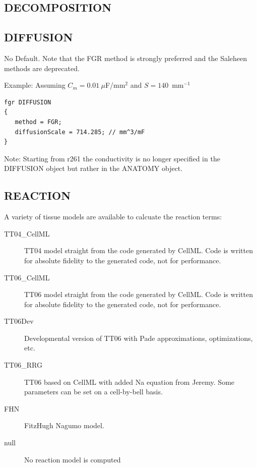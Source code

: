 \documentclass{article}
\begin{document}
\subsection{DECOMPOSITION}
\begin{keywords}
\end{keywords}

\subsection{DIFFUSION}

\begin{keywords}
  {No Default. Note that the FGR method is strongly preferred and the
    Saleheen methods are deprecated.  }
\end{keywords}


Example:
Assuming $C_m = 0.01~\mu$F/mm$^2$ and $S=140$~mm$^{-1}$
\begin{verbatim}
fgr DIFFUSION
{
   method = FGR;
   diffusionScale = 714.285; // mm^3/mF
}
\end{verbatim}

Note: Starting from r261 the conductivity is no longer specified in the
DIFFUSION object but rather in the ANATOMY object.

\subsection{REACTION}
A variety of tissue models are available to calcuate the reaction terms:

\begin{description}
  \item[TT04\_CellML] TT04 model straight from the code generated by
    CellML.  Code is written for absolute fidelity to the generated
    code, not for performance.
  \item[TT06\_CellML] TT06 model straight from the code generated by
    CellML.  Code is written for absolute fidelity to the generated
    code, not for performance.
  \item[TT06Dev] Developmental version of TT06 with Pade approximations,
    optimizations, etc.
  \item[TT06\_RRG] TT06 based on CellML with added Na equation from
    Jeremy.  Some parameters can be set on a cell-by-bell basis.
  \item[FHN] FitzHugh Nagumo model.
  \item[null] No reaction model is computed
\end{description}
\end{document}
